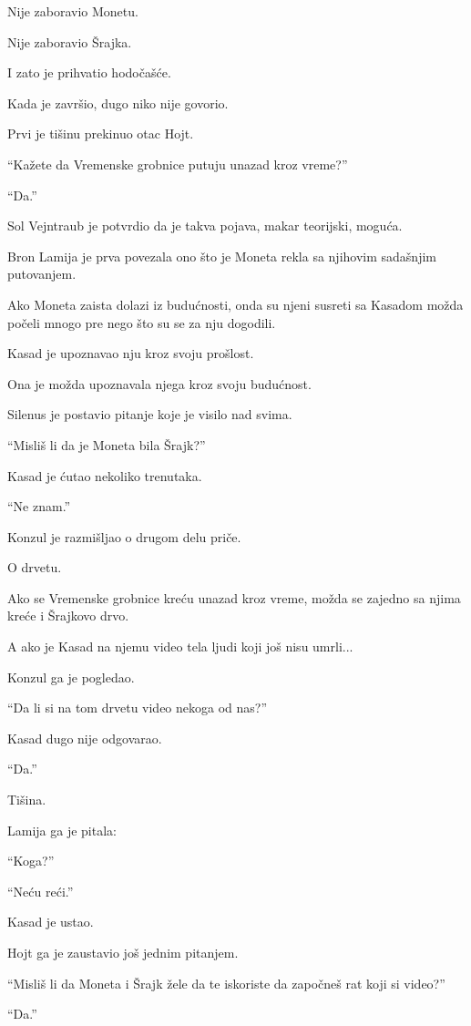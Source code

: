 Nije zaboravio Monetu.

Nije zaboravio Šrajka.

I zato je prihvatio hodočašće.

\bigskip

Kada je završio, dugo niko nije govorio.

Prvi je tišinu prekinuo otac Hojt.

``Kažete da Vremenske grobnice putuju unazad kroz vreme?''

``Da.''

Sol Vejntraub je potvrdio da je takva pojava, makar teorijski, moguća.

Bron Lamija je prva povezala ono što je Moneta rekla sa njihovim sadašnjim putovanjem.

Ako Moneta zaista dolazi iz budućnosti, onda su njeni susreti sa Kasadom možda počeli mnogo pre nego što su se za nju dogodili.

Kasad je upoznavao nju kroz svoju prošlost.

Ona je možda upoznavala njega kroz svoju budućnost.

Silenus je postavio pitanje koje je visilo nad svima.

``Misliš li da je Moneta bila Šrajk?''

Kasad je ćutao nekoliko trenutaka.

``Ne znam.''

Konzul je razmišljao o drugom delu priče.

O drvetu.

Ako se Vremenske grobnice kreću unazad kroz vreme, možda se zajedno sa njima kreće i Šrajkovo drvo.

A ako je Kasad na njemu video tela ljudi koji još nisu umrli...

Konzul ga je pogledao.

``Da li si na tom drvetu video nekoga od nas?''

Kasad dugo nije odgovarao.

``Da.''

Tišina.

Lamija ga je pitala:

``Koga?''

``Neću reći.''

Kasad je ustao.

Hojt ga je zaustavio još jednim pitanjem.

``Misliš li da Moneta i Šrajk žele da te iskoriste da započneš rat koji si video?''

``Da.''


